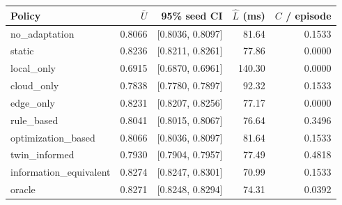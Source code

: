 \begin{tabular}{lrrrr}
\toprule
Policy & $\bar U$ & 95\% seed CI & $\widehat L$ (ms) & $C$ / episode \\
\midrule
no\_adaptation & 0.8066 & [0.8036, 0.8097] & 81.64 & 0.1533 \\
static & 0.8236 & [0.8211, 0.8261] & 77.86 & 0.0000 \\
local\_only & 0.6915 & [0.6870, 0.6961] & 140.30 & 0.0000 \\
cloud\_only & 0.7838 & [0.7780, 0.7897] & 92.32 & 0.1533 \\
edge\_only & 0.8231 & [0.8207, 0.8256] & 77.17 & 0.0000 \\
rule\_based & 0.8041 & [0.8015, 0.8067] & 76.64 & 0.3496 \\
optimization\_based & 0.8066 & [0.8036, 0.8097] & 81.64 & 0.1533 \\
twin\_informed & 0.7930 & [0.7904, 0.7957] & 77.49 & 0.4818 \\
information\_equivalent & 0.8274 & [0.8247, 0.8301] & 70.99 & 0.1533 \\
oracle & 0.8271 & [0.8248, 0.8294] & 74.31 & 0.0392 \\
\bottomrule
\end{tabular}
